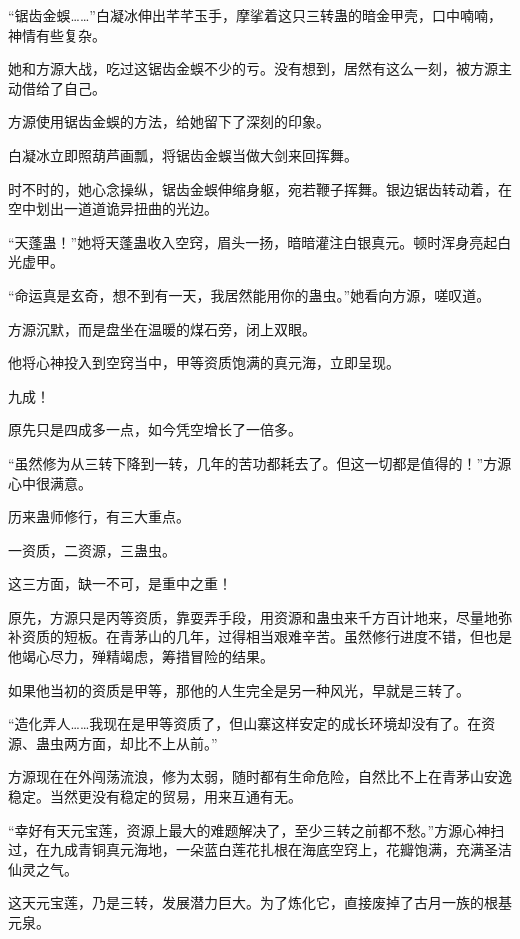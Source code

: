 
\begin{this_body}



“锯齿金蜈……”白凝冰伸出芊芊玉手，摩挲着这只三转蛊的暗金甲壳，口中喃喃，神情有些复杂。

她和方源大战，吃过这锯齿金蜈不少的亏。没有想到，居然有这么一刻，被方源主动借给了自己。

方源使用锯齿金蜈的方法，给她留下了深刻的印象。

白凝冰立即照葫芦画瓢，将锯齿金蜈当做大剑来回挥舞。

时不时的，她心念操纵，锯齿金蜈伸缩身躯，宛若鞭子挥舞。银边锯齿转动着，在空中划出一道道诡异扭曲的光边。

“天蓬蛊！”她将天蓬蛊收入空窍，眉头一扬，暗暗灌注白银真元。顿时浑身亮起白光虚甲。

“命运真是玄奇，想不到有一天，我居然能用你的蛊虫。”她看向方源，嗟叹道。

方源沉默，而是盘坐在温暖的煤石旁，闭上双眼。

他将心神投入到空窍当中，甲等资质饱满的真元海，立即呈现。

九成！

原先只是四成多一点，如今凭空增长了一倍多。

“虽然修为从三转下降到一转，几年的苦功都耗去了。但这一切都是值得的！”方源心中很满意。

历来蛊师修行，有三大重点。

一资质，二资源，三蛊虫。

这三方面，缺一不可，是重中之重！

原先，方源只是丙等资质，靠耍弄手段，用资源和蛊虫来千方百计地来，尽量地弥补资质的短板。在青茅山的几年，过得相当艰难辛苦。虽然修行进度不错，但也是他竭心尽力，殚精竭虑，筹措冒险的结果。

如果他当初的资质是甲等，那他的人生完全是另一种风光，早就是三转了。

“造化弄人……我现在是甲等资质了，但山寨这样安定的成长环境却没有了。在资源、蛊虫两方面，却比不上从前。”

方源现在在外闯荡流浪，修为太弱，随时都有生命危险，自然比不上在青茅山安逸稳定。当然更没有稳定的贸易，用来互通有无。

“幸好有天元宝莲，资源上最大的难题解决了，至少三转之前都不愁。”方源心神扫过，在九成青铜真元海地，一朵蓝白莲花扎根在海底空窍上，花瓣饱满，充满圣洁仙灵之气。

这天元宝莲，乃是三转，发展潜力巨大。为了炼化它，直接废掉了古月一族的根基元泉。


\end{this_body}

